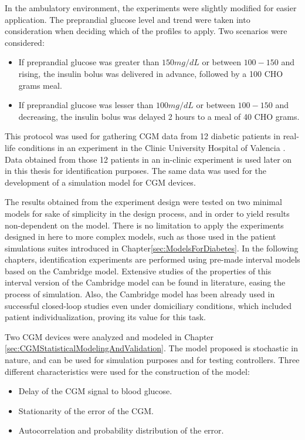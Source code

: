 In the ambulatory environment, the experiments were slightly modified for easier application. The preprandial glucose level and trend were taken into consideration when deciding which of the profiles to apply. Two scenarios were considered:
	
	\begin{itemize}
		\item If preprandial glucose was greater than $150 mg/dL$ or between $100-150$ and rising, the insulin bolus was delivered in advance, followed by a 100 CHO grams meal.
		\item If preprandial glucose was lesser than $100 mg/dL$ or between $100-150$ and decreasing, the insulin bolus was delayed 2 hours to a meal of 40 CHO grams.
	\end{itemize}

This protocol was used for gathering CGM data from 12 diabetic patients in real-life conditions in an experiment in the Clinic University Hospital of Valencia \cite{paoloibolus2012}. Data obtained from those 12 patients in an in-clinic experiment is used later on in this thesis for identification purposes. The same data was used for the development of a simulation model for CGM devices.

The results obtained from the experiment design were tested on two minimal models for sake of simplicity in the design process, and in order to yield results non-dependent on the model. There is no limitation to apply the experiments designed in here to more complex models, such as those used in the patient simulations suites introduced in Chapter\ref{sec:ModelsForDiabetes}. In the following chapters, identification experiments are performed using pre-made interval models based on the Cambridge model. Extensive studies of the properties of this interval version of the Cambridge model can be found in literature, easing the process of simulation. Also, the Cambridge model has been already used in successful closed-loop studies even under domiciliary conditions, which included patient individualization, proving its value for this task.

Two CGM devices were analyzed and modeled in Chapter \ref{sec:CGMStatisticalModelingAndValidation}. The model proposed is stochastic in nature, and can be used for simulation purposes and for testing controllers. Three different characteristics were used for the construction of the model:

\begin{itemize}
	\item Delay of the CGM signal to blood glucose.
	\item Stationarity of the error of the CGM.
	\item Autocorrelation and probability distribution of the error.
\end{itemize}

